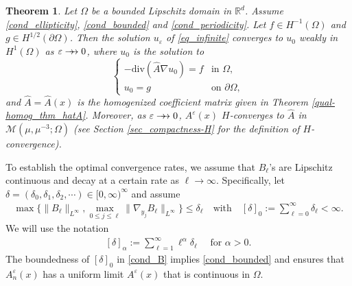 \documentclass[reqno,12pt]{amsart} %
\newtheorem{theorem}{Theorem}[section]
\theoremstyle{definition}
\theoremstyle{remark}
\numberwithin{equation}{section}
\newcommand{\R}{\mathbb{R}}
\newcommand{\doublerightarrow}{%
  \mathrel{%
    \mathchoice
      {\rightarrow\mspace{-10mu}\rightarrow} %
      {\rightarrow\mspace{-10mu}\rightarrow} %
      {\rightarrow\mspace{-10mu}\rightarrow} %
      {\rightarrow\mspace{-10mu}\rightarrow} %
  }%
}
\begin{document}
\begin{theorem}\label{thm.qualitative}
Let $\Omega$ be a bounded Lipschitz domain in $\R^d$. Assume \eqref{cond_ellipticity}, \eqref{cond_bounded} and \eqref{cond_periodicity}. Let $f\in H^{-1}(\Omega)$ and $g\in H^{1/2}(\partial\Omega)$. Then the solution $u_\varepsilon$ of \eqref{eq_infinite} converges to $u_0$ weakly in $H^1(\Omega)$ as $\varepsilon\doublerightarrow 0$, where $u_0$ is the solution to
  \begin{equation}
    \label{eq_homogenized}
    \begin{cases}
      -\mathrm{div}(\widehat{A}\nabla u_0)=f&\text{in }\Omega,\\
      u_0=g&\text{on }\partial\Omega,
    \end{cases}
  \end{equation}
  and $\widehat{A}=\widehat{A}(x)$ is the homogenized coefficient matrix given in Theorem \ref{qual-homog_thm_hatA}. Moreover, as $\varepsilon\doublerightarrow 0$, $A^\varepsilon(x)$ $H$-converges to $\widehat{A}$ in $\mathcal{M}(\mu, \mu^{-3}; \Omega)$ (see Section \ref{sec_compactness-H} for the definition of $H$-convergence). 
\end{theorem}

To establish the optimal convergence rates, we assume that $B_\ell$'s are Lipschitz continuous and decay at a certain rate as $\ell \to \infty$. Specifically, let $\delta = (\delta_0, \delta_1,\delta_2,\cdots) \in [0,\infty)^\infty$ and assume
\begin{align}\label{cond_B}
  \max\Big\{\|B_\ell\|_{L^\infty}, \max_{0\leq j\leq \ell}\|\nabla_{y_j}B_\ell\|_{L^\infty}\Big\}\leq \delta_\ell\quad\text{with}\quad [\delta]_0:=\sum_{\ell=0}^\infty \delta_\ell<\infty.
\end{align}
We will use the notation 
\begin{align}
  \label{def_norm_delta}
  [\delta]_\alpha:=\sum_{\ell=1}^\infty \ell^\alpha \delta_\ell\quad \text{ for } \alpha>  0.
\end{align}
The boundedness of $[\delta]_0$ in \eqref{cond_B} implies \eqref{cond_bounded} and
ensures that $A_n^\varepsilon(x)$ has a uniform limit $A^\varepsilon(x) $ that is continuous in $\Omega$.
\end{document}
